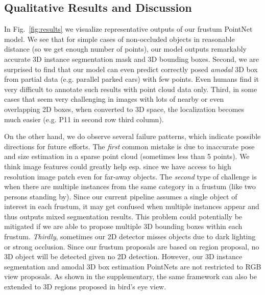 
\vspace{-.16in}
\subsection{Qualitative Results and Discussion}
\label{sec:exp_viz}
In Fig.~\ref{fig:results} we visualize representative outputs of our frustum PointNet model. We see that for simple cases of non-occluded objects in reasonable distance (so we get enough number of points), our model outputs remarkably accurate 3D instance segmentation mask and 3D bounding boxes. Second, we are surprised to find that our model can even predict correctly posed \emph{amodal} 3D box from partial data (e.g. parallel parked cars) with few points. Even humans find it very difficult to annotate such results with point cloud data only. Third, in some cases that seem very challenging in images with lots of nearby or even overlapping 2D boxes, when converted to 3D space, the localization becomes much easier (e.g. P11 in second row third column).

On the other hand, we do observe several failure patterns, which indicate possible directions for future efforts.
The \emph{first} common mistake is due to inaccurate pose and size estimation in a sparse point cloud (sometimes less than 5 points). We think image features could greatly help esp. since we have access to high resolution image patch even for far-away objects.
The \emph{second} type of challenge is when there are multiple instances from the same category in a frustum (like two persons standing by). Since our current pipeline assumes a single object of interest in each frustum, it may get confused when multiple instances appear and thus outputs mixed segmentation results. This problem could potentially be mitigated if we are able to propose multiple 3D bounding boxes within each frustum.
\emph{Thirdly}, sometimes our 2D detector misses objects due to dark lighting or strong occlusion.  Since our frustum proposals are based on region proposal, no 3D object will be detected given no 2D detection. However, our 3D instance segmentation and amodal 3D box estimation PointNets are not restricted to RGB view proposals. As shown in the supplementary, the same framework can also be extended to 3D regions proposed in bird's eye view.



